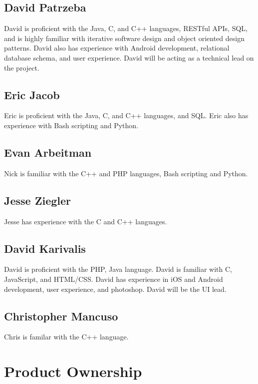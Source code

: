 \documentclass[11pt,letterpaper,oneside]{memoir}
\begin{document}
\section{David Patrzeba}

David is proficient with the Java, C, and C++ languages, RESTful APIs, SQL, and is
highly familiar with iterative software design and object oriented design patterns.
David also has experience with Android development, relational database schema, and
user experience.  David will be acting as a technical lead on the project.

\section{Eric Jacob}

Eric is proficient with the Java, C, and C++ languages, and SQL.  Eric also has
experience with Bash scripting and Python.

\section{Evan Arbeitman}

Nick is familiar with the C++ and PHP languages, Bash scripting and Python.

\section{Jesse Ziegler}

Jesse has experience with the C and C++ languages.

\section{David Karivalis}

David is proficient with the PHP, Java language. David is familiar with C, JavaScript, and HTML/CSS.
David has experience in iOS and Android development, user experience, and photoshop.  David will be
the UI lead.

\section{Christopher Mancuso}

Chris is familar with the C++ language.

\chapter{Product Ownership}
\end{document}
